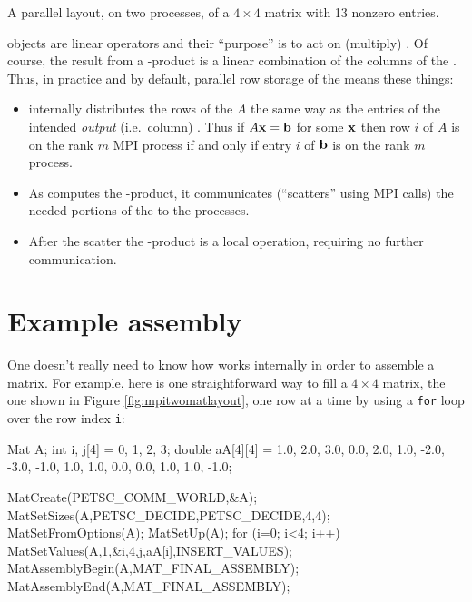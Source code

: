 \begin{marginfigure}

\caption{A parallel \pMat layout, on two processes, of a $4\times 4$ matrix with 13 nonzero entries.}
\label{fig:mpitwomatlayout}
\end{marginfigure}

\pMat objects are linear operators and their ``purpose'' is to act on (multiply) \pVecs.  Of course, the result \pVec from a \pMat-\pVec product is a linear combination of the columns of the \pMat \citep{TrefethenBau1997}.  Thus, in practice and by default, parallel row storage of the \pMat means these things:
\begin{itemize}
\item \PETSc internally distributes the rows of the \pMat $A$ the same way as the entries of the intended \emph{output} (i.e.~column) \pVec.  Thus if $A\mathbf{x}=\mathbf{b}$ for some \pVec $\mathbf{x}$ then row $i$ of $A$ is on the rank $m$ MPI process if and only if entry $i$ of \pVec $\mathbf{b}$ is on the rank $m$ process.
\item As \PETSc computes the \pMat-\pVec product, it communicates (``scatters'' using MPI calls) the needed portions of the \pVec to the processes.
\item After the scatter the \pMat-\pVec product is a local operation, requiring no further communication.
\end{itemize}


\section{Example \pMat assembly}

One doesn't really need to know how \PETSc works internally in order to assemble a matrix.  For example, here is one straightforward way to fill a $4\times 4$ matrix, the one shown in Figure \ref{fig:mpitwomatlayout}, one row at a time by using a \texttt{for} loop over the row index \texttt{i}:
\begin{code}
Mat    A;
int    i, j[4] = {0, 1, 2, 3};
double aA[4][4] = {{ 1.0,  2.0,  3.0,  0.0},
                   { 2.0,  1.0, -2.0, -3.0},
                   {-1.0,  1.0,  1.0,  0.0},
                   { 0.0,  1.0,  1.0, -1.0}};

MatCreate(PETSC_COMM_WORLD,&A);
MatSetSizes(A,PETSC_DECIDE,PETSC_DECIDE,4,4);
MatSetFromOptions(A);
MatSetUp(A);
for (i=0; i<4; i++) {
    MatSetValues(A,1,&i,4,j,aA[i],INSERT_VALUES);
}
MatAssemblyBegin(A,MAT_FINAL_ASSEMBLY);
MatAssemblyEnd(A,MAT_FINAL_ASSEMBLY);
\end{code}

